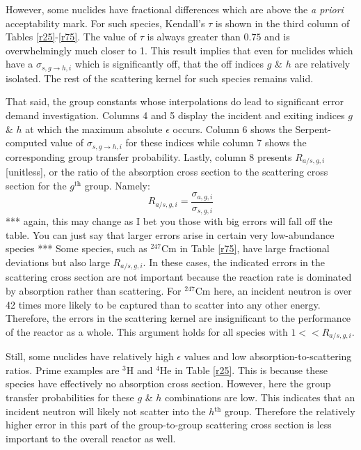 \documentclass{physor2012}
\newcommand{\superscript}[1]{\ensuremath{^{\textrm{#1}}}}
\newcommand{\nuc}[2]{\superscript{#2}{#1}}
\begin{document}
However, some nuclides have fractional differences which are above the
\emph{a priori} acceptability mark.  For such species, Kendall's $\tau$ is
shown in the third column of Tables \ref{r25}-\ref{r75}.  The value of
$\tau$ is always greater than $0.75$ and is overwhelmingly much closer to 1.
This result implies that even for nuclides which have a $\sigma_{s,g\to h,i}$ which
is significantly off, that the off indices $g$ \& $h$ are relatively isolated.
The rest of the scattering kernel for such species remains valid.

That said, the group constants whose interpolations do lead to significant error
demand investigation.  Columns 4 and 5 display the incident and exiting indices
$g$ \& $h$ at which the maximum absolute $\epsilon$ occurs.  Column 6 shows
the Serpent-computed value of $\sigma_{s,g\to h,i}$ for these indices while column 7
shows the corresponding group transfer probability.  Lastly, column 8 presents
$R_{a/s,g,i}$ [unitless], or the ratio of the absorption cross section to the
scattering cross section for the $g$\superscript{th} group.  Namely:
\begin{equation}
\label{R_as}
R_{a/s,g,i} = \frac{\sigma_{a,g,i}}{\sigma_{s,g,i}}
\end{equation}
*** again, this may change as I bet you those with big errors will fall off the table.  You can just say that larger errors arise in certain very low-abundance species ***
Some species, such as \nuc{Cm}{247} in Table \ref{r75}, have large fractional deviations
but also large $R_{a/s,g,i}$.  In these cases, the indicated errors in the
scattering cross section are not important because the reaction rate is dominated
by absorption rather than scattering.  For \nuc{Cm}{247} here, an incident neutron is
over 42 times more likely to be captured than to scatter into any other energy.
Therefore, the errors in the scattering kernel are insignificant to the performance
of the reactor as a whole.  This argument holds for all species with $1 << R_{a/s,g,i}$.

Still, some nuclides have relatively high $\epsilon$ values and
low absorption-to-scattering ratios.  Prime examples are \nuc{H}{3} and \nuc{He}{4}
in Table \ref{r25}.  This is because these species have effectively no
absorption cross section.  However, here the group transfer probabilities
for these $g$ \& $h$ combinations are low.  This indicates that an incident
neutron will likely not scatter into the $h$\superscript{th} group.  Therefore the
relatively higher error in this part of the group-to-group scattering cross section
is less important to the overall reactor as well.
\end{document}
